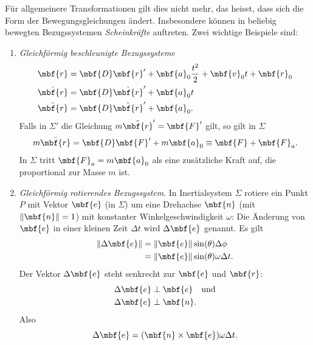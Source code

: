 Für allgemeinere Transformationen gilt dies nicht mehr, das heisst, dass sich die Form der Bewegungsgleichungen ändert. Insbesondere können in beliebig bewegten Bezugssystemen \emph{Scheinkräfte} auftreten. Zwei wichtige Beispiele sind:
\begin{enumerate}
  \item \emph{Gleichförmig beschleunigte Bezugssysteme}
  \begin{equation}
    \begin{split}
      \mbf{r} &= \mbf{D}\mbf{r}' + \mbf{a}_0 \frac{t^2}{2}  + \mbf{v}_0 t + \mbf{r}_0 \\
      \dot{\mbf{r}} &= \mbf{D}\dot{\mbf{r}}' + \mbf{a}_0 t \\
      \ddot{\mbf{r}} &= \mbf{D}\ddot{\mbf{r}}' + \mbf{a}_0.
    \end{split}
  \end{equation}
  Falls in $\Sigma'$ die Gleichung $m\ddot{\mbf{r}}' = \mbf{F}'$ gilt, so gilt in $\Sigma$
  \begin{equation}
    m\ddot{\mbf{r}} = \mbf{D}\mbf{F}' + m\mbf{a}_0 \equiv \mbf{F} + \mbf{F}_a.
  \end{equation}
  In $\Sigma$ tritt $\mbf{F}_a = m\mbf{a}_0$ als eine zusätzliche Kraft auf, die proportional zur Masse $m$ ist.
  \item \emph{Gleichförmig rotierendes Bezugssystem}. In Inertialsystem $\Sigma$ rotiere ein Punkt $P$ mit Vektor $\mbf{e}$ (in $\Sigma$) um eine Drehachse $\mbf{n}$ (mit $\|\mbf{n}\| =1$) mit konstanter Winkelgeschwindigkeit $\omega$:
  \figbox
  Die Änderung von $\mbf{e}$ in einer kleinen Zeit $\Delta t$ wird $\Delta \mbf{e}$ genannt. Es gilt
  \begin{equation}
    \begin{split}
      \|\Delta \mbf{e}\| &= \|\mbf{e}\|\sin(\theta) \Delta \phi \\
      &= \|\mbf{e}\|\sin(\theta) \omega \Delta t. 
    \end{split}
  \end{equation}
  Der Vektor $\Delta \mbf{e}$ steht senkrecht zur $\mbf{e}$ und $\mbf{r}$:
  \begin{equation}
    \begin{split}
      \Delta \mbf{e} &\perp \mbf{e}\quad \text{und} \\
      \Delta \mbf{e} &\perp \mbf{n}.
    \end{split}
  \end{equation}
  Also 
  \begin{equation}
    \Delta\mbf{e} = (\mbf{n}\times \mbf{e}) \omega \Delta t.

\end{equation}
\end{enumerate}
